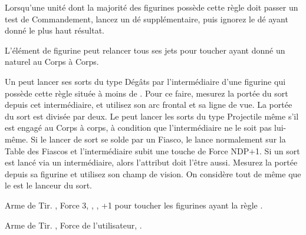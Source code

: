 \newcommand{\QRSnote}{%
\noindent\refsymbol{} Un membre d'équipage de moins quand il sert de monture.
}











\startarmyspecialrules

\armyspecialruleentry{\coldblooded}

Lorsqu'une unité dont la majorité des figurines possède cette règle doit passer un test de Commandement, lancez un dé supplémentaire, puis ignorez le dé ayant donné le plus haut résultat.

\armyspecialruleentry{\bornpredator}

L'élément de figurine peut relancer tous ses jets pour toucher ayant donné un  naturel au Corps à Corps.

\armyspecialruleentry{\telepathiclink}

Un \cuatllord{} peut lancer ses sorts du type Dégâts par l'intermédiaire d'une figurine qui possède cette règle située à moins de . Pour ce faire, mesurez la portée du sort depuis cet intermédiaire, et utilisez son arc frontal et sa ligne de vue. La portée du sort est divisée par deux. Le \cuatllord{} peut lancer les sorts du type Projectile même s'il est engagé au Corps à corps, à condition que l'intermédiaire ne le soit pas lui-même. Si le lancer de sort se solde par un Fiasco, le \cuatllord{} lance normalement sur la Table des Fiascos et l'intermédiaire subit une touche de Force NDP+1. Si un sort est lancé via un intermédiaire, alors l'attribut doit l'être aussi. Mesurez la portée depuis sa figurine et utilisez son champ de vision. On considère tout de même que le \cuatllord{} est le lanceur du sort.

\closearmyspecialrules






\vspace{1.5cm}
\startarmyarmoury

\startitemlistonecol

\listitemonecol{\blowpipe} Arme de Tir. , Force 3, \poisonedattacks{}, , +1 pour toucher les figurines ayant la règle \largetarget{}.

\listitemonecol{\javelin} Arme de Tir. , Force de l'utilisateur, \quicktofire{}.

